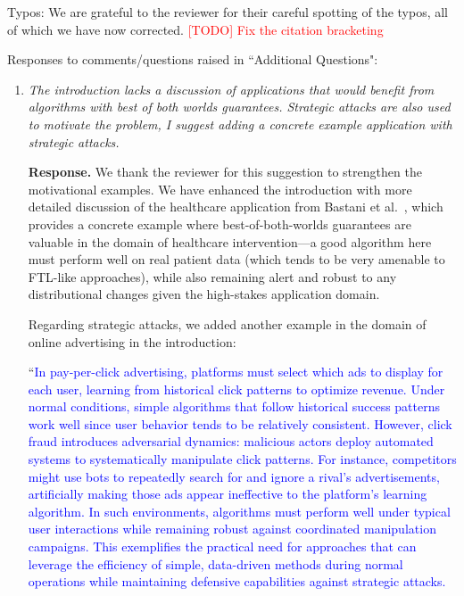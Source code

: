 \documentclass[11pt]{article}
\begin{document}
Typos: We are grateful to the reviewer for their careful spotting of the typos, all of which we have now corrected.
\textcolor{red}{[TODO] Fix the citation bracketing}


Responses to comments/questions raised in ``Additional Questions":

\begin{enumerate}
    \item \emph{The introduction lacks a discussion of applications that would benefit from algorithms with best of both worlds guarantees. Strategic attacks are also used to motivate the problem, I suggest adding a concrete example application with strategic attacks.}

    {\bf Response.} We thank the reviewer for this suggestion to strengthen the motivational examples. We have enhanced the introduction with more detailed discussion of the healthcare application from Bastani et al.~\cite{bastani2021mostly}, which provides a concrete example where best-of-both-worlds guarantees are valuable in the domain of healthcare intervention---a good algorithm here must perform well on real patient data (which tends to be very amenable to FTL-like approaches), while also remaining alert and robust to any distributional changes given the high-stakes application domain. 
    
    Regarding strategic attacks, we added another example in the domain of online advertising in the introduction:

    ``\textcolor{blue}{In pay-per-click advertising, platforms must select which ads to display for each user, learning from historical click patterns to optimize revenue. Under normal conditions, simple algorithms that follow historical success patterns work well since user behavior tends to be relatively consistent. However, click fraud introduces adversarial dynamics: malicious actors deploy automated systems to systematically manipulate click patterns. For instance, competitors might use bots to repeatedly search for and ignore a rival's advertisements, artificially making those ads appear ineffective to the platform's learning algorithm. In such environments, algorithms must perform well under typical user interactions while remaining robust against coordinated manipulation campaigns. This exemplifies the practical need for approaches that can leverage the efficiency of simple, data-driven methods during normal operations while maintaining defensive capabilities against strategic attacks.}


\end{enumerate}



\end{document}
